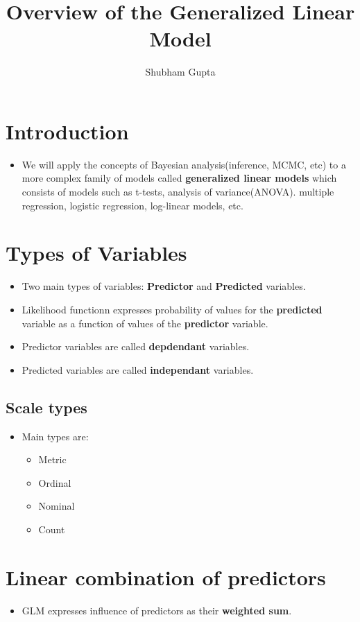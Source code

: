 \documentclass[a4paper]{article}
\title{Overview of the Generalized Linear Model}
\author{Shubham Gupta}
\begin{document}
\maketitle
\section{Introduction}
\begin{itemize}
    \item We will apply the concepts of Bayesian analysis(inference, MCMC, etc) to a more complex family of models called \textbf{generalized linear models} which consists of models such as t-tests, analysis of variance(ANOVA). multiple regression, logistic regression, log-linear models, etc.
\end{itemize}
\section{Types of Variables}
\begin{itemize}
    \item Two main types of variables: \textbf{Predictor} and \textbf{Predicted} variables.  
    \item Likelihood functionn expresses probability of values for the \textbf{predicted} variable as a function of values of the \textbf{predictor} variable.  
    \item Predictor variables are called \textbf{depdendant} variables.
    \item Predicted variables are called \textbf{independant} variables. 
\end{itemize}
\subsection{Scale types}
\begin{itemize}
    \item Main types are:
        \begin{itemize}
            \item Metric
            \item Ordinal
            \item Nominal
            \item Count
        \end{itemize}
\end{itemize}
\section{Linear combination of predictors}
\begin{itemize}
    \item GLM expresses influence of predictors as their \textbf{weighted sum}.  
\end{itemize}
\end{document}
